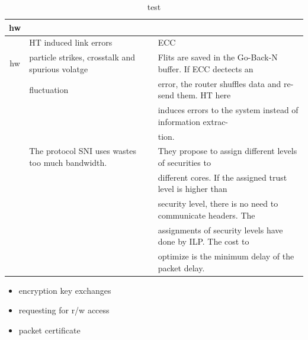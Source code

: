 \documentclass[]{article}
\begin{document}
\begin{table}[!t]
\begin{tabular}{c l l}
	hw						&													&\\
	\hline
	~\cite{yu2013exploiting}& HT induced link errors							& ECC\\
	hw						& particle strikes, crosstalk and spurious volatge  & Flits are saved in the Go-Back-N buffer. If ECC dectects an \\
							& fluctuation										& error, the router shuffles data and re-send them. HT here  \\
							&													& induces errors to the system instead of information extrac-\\
							&													& tion.\\
	\hline
	~\cite{hu2015automatic} & The protocol SNI uses wastes too much bandwidth.  & They propose to assign different levels of securities to 	\\
							&													& different cores. If the assigned trust level is higher than\\
							&													& security level, there is no need to communicate headers. The \\
							&													& assignments of security levels have done by ILP. The cost to\\
							&													& optimize is the minimum delay of the packet delay. \\
	
	\end{tabular}
	\caption{test}
\end{table}

\begin{itemize}
	\item encryption key exchanges
	\item requesting for r/w access
	\item packet certificate	
\end{itemize}

{}

\end{document}
